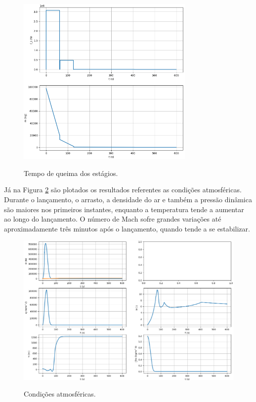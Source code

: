 \begin{figure}[H]
    \begin{center}
        \caption{Tempo de queima dos estágios.}
        \includegraphics[width=3.4in]{figuras/fig3aula27.png}
        \label{fig:3}
     \end{center}
\end{figure}

Já na Figura \ref{fig:4} são plotados os resultados referentes as condições atmosféricas. Durante o lançamento, o arrasto, a densidade do ar e também a pressão dinâmica são maiores nos primeiros instantes, enquanto a temperatura tende a aumentar ao longo do lançamento. O número de Mach sofre grandes variações até aproximadamente três minutos após o lançamento, quando tende a se estabilizar.

\begin{figure}[H]
    \begin{center}
        \caption{Condições atmosféricas.}
        \includegraphics[width=4.5in]{figuras/fig4aula27a.png}
        \label{fig:4}
     \end{center}
\end{figure}


